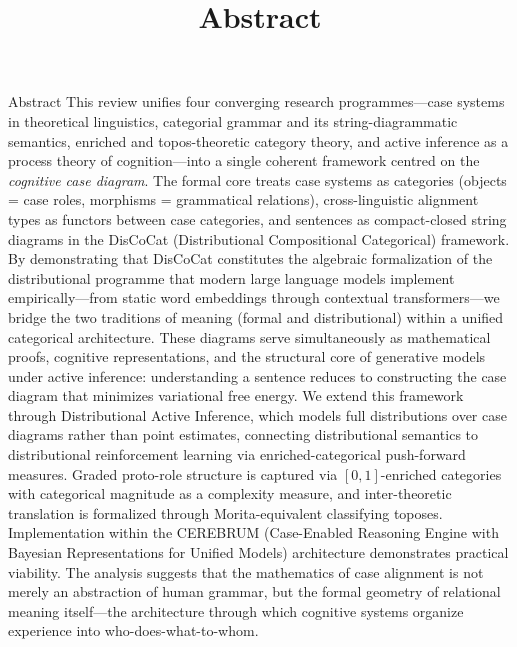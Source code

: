 \documentclass[
  ignorenonframetext,
]{beamer}
\title{\texorpdfstring{Abstract}{Abstract}}
\author{\texorpdfstring{}{}}
\date{}
\begin{document}
\frame{\titlepage}

\begin{frame}{Abstract}
\protect{}\label{abstract}
This review unifies four converging research programmes---case systems
in theoretical linguistics, categorial grammar and its
string-diagrammatic semantics, enriched and topos-theoretic category
theory, and active inference as a process theory of cognition---into a
single coherent framework centred on the \emph{cognitive case diagram}.
The formal core treats case systems as categories (objects = case roles,
morphisms = grammatical relations), cross-linguistic alignment types as
functors between case categories, and sentences as compact-closed string
diagrams in the DisCoCat (Distributional Compositional Categorical)
framework. By demonstrating that DisCoCat constitutes the algebraic
formalization of the distributional programme that modern large language
models implement empirically---from static word embeddings through
contextual transformers---we bridge the two traditions of meaning
(formal and distributional) within a unified categorical architecture.
These diagrams serve simultaneously as mathematical proofs, cognitive
representations, and the structural core of generative models under
active inference: understanding a sentence reduces to constructing the
case diagram that minimizes variational free energy. We extend this
framework through Distributional Active Inference, which models full
distributions over case diagrams rather than point estimates, connecting
distributional semantics to distributional reinforcement learning via
enriched-categorical push-forward measures. Graded proto-role structure
is captured via \([0,1]\)-enriched categories with categorical magnitude
as a complexity measure, and inter-theoretic translation is formalized
through Morita-equivalent classifying toposes. Implementation within the
CEREBRUM (Case-Enabled Reasoning Engine with Bayesian Representations
for Unified Models) architecture demonstrates practical viability. The
analysis suggests that the mathematics of case alignment is not merely
an abstraction of human grammar, but the formal geometry of relational
meaning itself---the architecture through which cognitive systems
organize experience into who-does-what-to-whom.
\end{frame}
\end{document}
